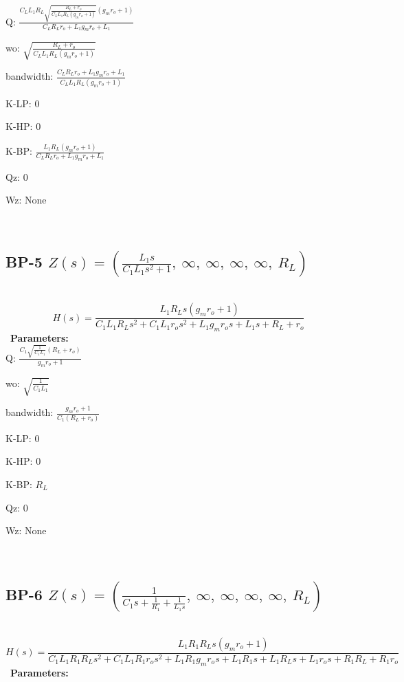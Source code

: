 \documentclass{article}
\begin{document}
Q: $\frac{C_{L} L_{1} R_{L} \sqrt{\frac{R_{L} + r_{o}}{C_{L} L_{1} R_{L} \left(g_{m} r_{o} + 1\right)}} \left(g_{m} r_{o} + 1\right)}{C_{L} R_{L} r_{o} + L_{1} g_{m} r_{o} + L_{1}}$\ 

wo: $\sqrt{\frac{R_{L} + r_{o}}{C_{L} L_{1} R_{L} \left(g_{m} r_{o} + 1\right)}}$\ 

bandwidth: $\frac{C_{L} R_{L} r_{o} + L_{1} g_{m} r_{o} + L_{1}}{C_{L} L_{1} R_{L} \left(g_{m} r_{o} + 1\right)}$\ 

K-LP: $0$\ 

K-HP: $0$\ 

K-BP: $\frac{L_{1} R_{L} \left(g_{m} r_{o} + 1\right)}{C_{L} R_{L} r_{o} + L_{1} g_{m} r_{o} + L_{1}}$\ 

Qz: $0$\ 

Wz: $\text{None}$\ 

\ 

\subsection{BP-5 $Z(s) = \left( \frac{L_{1} s}{C_{1} L_{1} s^{2} + 1}, \  \infty, \  \infty, \  \infty, \  \infty, \  R_{L}\right)$ } \ 
\textbf{\[H(s) = \frac{L_{1} R_{L} s \left(g_{m} r_{o} + 1\right)}{C_{1} L_{1} R_{L} s^{2} + C_{1} L_{1} r_{o} s^{2} + L_{1} g_{m} r_{o} s + L_{1} s + R_{L} + r_{o}}\] } \ 
\textbf{Parameters:}\\ 

Q: $\frac{C_{1} \sqrt{\frac{1}{C_{1} L_{1}}} \left(R_{L} + r_{o}\right)}{g_{m} r_{o} + 1}$\ 

wo: $\sqrt{\frac{1}{C_{1} L_{1}}}$\ 

bandwidth: $\frac{g_{m} r_{o} + 1}{C_{1} \left(R_{L} + r_{o}\right)}$\ 

K-LP: $0$\ 

K-HP: $0$\ 

K-BP: $R_{L}$\ 

Qz: $0$\ 

Wz: $\text{None}$\ 

\ 

\subsection{BP-6 $Z(s) = \left( \frac{1}{C_{1} s + \frac{1}{R_{1}} + \frac{1}{L_{1} s}}, \  \infty, \  \infty, \  \infty, \  \infty, \  R_{L}\right)$ } \ 
\textbf{\[H(s) = \frac{L_{1} R_{1} R_{L} s \left(g_{m} r_{o} + 1\right)}{C_{1} L_{1} R_{1} R_{L} s^{2} + C_{1} L_{1} R_{1} r_{o} s^{2} + L_{1} R_{1} g_{m} r_{o} s + L_{1} R_{1} s + L_{1} R_{L} s + L_{1} r_{o} s + R_{1} R_{L} + R_{1} r_{o}}\] } \ 
\textbf{Parameters:}\\ 
\end{document}
